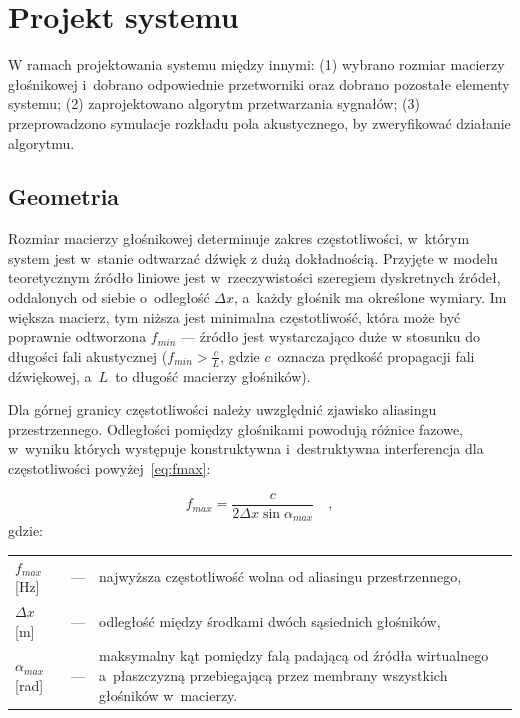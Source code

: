 \documentclass[10pt, a4paper]{article}
\let\Oldsection\section
\renewcommand{\section}{\FloatBarrier\Oldsection}
\let\Oldsubsection\subsection
\renewcommand{\subsection}{\FloatBarrier\Oldsubsection}
\begin{document}
\section{Projekt systemu}

W ramach projektowania systemu między innymi: (1) wybrano rozmiar macierzy
głośnikowej i~dobrano odpowiednie przetworniki oraz dobrano pozostałe elementy
systemu; (2) zaprojektowano algorytm przetwarzania sygnałów; (3) przeprowadzono
symulacje rozkładu pola akustycznego, by zweryfikować działanie algorytmu.

\subsection{Geometria}

Rozmiar macierzy głośnikowej determinuje zakres częstotliwości, w~którym system
jest w~stanie odtwarzać dźwięk z dużą dokładnością. Przyjęte w modelu teoretycznym 
źródło liniowe jest w~rzeczywistości szeregiem dyskretnych źródeł, oddalonych od siebie 
o~odległość $\Delta x$, a~każdy głośnik ma określone wymiary. Im większa macierz, tym niższa
jest minimalna częstotliwość, która może być poprawnie odtworzona $f_{min}$ --- źródło jest wystarczająco duże w stosunku 
do długości fali akustycznej ($f_{min}>\frac{c}{L}$, gdzie $c$~oznacza prędkość propagacji fali dźwiękowej,
a~$L$~to długość macierzy głośników).

Dla górnej granicy częstotliwości należy uwzględnić zjawisko aliasingu
przestrzennego. Odległości pomiędzy głośnikami powodują różnice fazowe, w~wyniku których 
występuje konstruktywna i~destruktywna interferencja dla częstotliwości powyżej~\eqref{eq:fmax}:

\begin{equation}
  f_{max}=\frac{c}{2\Delta x \sin{\alpha_{max}}} \quad, \label{eq:fmax}
\end{equation}
gdzie:\\
\indent \begin{tabular}{l c p{}}
  $f_{max}$ [\si{\hertz}] & --- & najwyższa częstotliwość wolna od aliasingu przestrzennego, \\
  $\Delta x$ [\si{\metre}] & --- & odległość między środkami dwóch sąsiednich głośników, \\
  $\alpha_{max}$ [\si{\radian}] & --- & maksymalny kąt pomiędzy falą padającą od źródła 
  wirtualnego a~płaszczyzną przebiegającą przez membrany wszystkich głośników w~macierzy.\\
\end{tabular}\\
\end{document}
